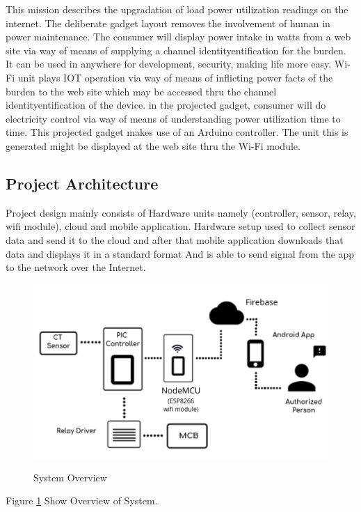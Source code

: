 \documentclass[12pt,a4paper]{article}
\begin{document}
This mission describes the upgradation of load power utilization readings on the internet. The deliberate gadget layout removes the involvement of human in power maintenance. The consumer will display power intake in watts from a web site via way of means of supplying a channel identityentification for the burden. It can be used in anywhere for development, security, making life more easy. Wi-Fi unit plays IOT operation via way of means of inflicting power facts of the burden to the web site which may be accessed thru the channel identityentification of the device. in the projected gadget, consumer will do electricity control via way of means of understanding power utilization time to time. This projected gadget makes use of an Arduino controller. The unit this is generated might be displayed at the web site thru the Wi-Fi module.\\

\subsection{Project Architecture}
\hspace{0.5cm}Project design mainly consists of Hardware units namely (controller, sensor, relay, wifi module), cloud and mobile application. Hardware setup used to collect sensor data and send it to the cloud and after that mobile application downloads that data and displays it in a standard format And is able to send signal from the app to the network over the Internet.\\


\begin{figure}[H]
	\centering
	\includegraphics[width=\linewidth]{FirebaseAr.png}\\
	\caption{System Overview}
	\label{fig:4.1}
\end{figure}
\begin{center}
Figure \ref{fig:4.1} Show Overview of System.
\end{center}
\end{document}
